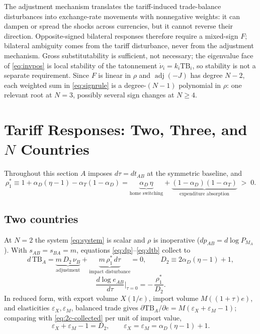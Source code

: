 \documentclass[11pt]{article}
\begin{document}
\noindent The adjustment mechanism translates the tariff-induced trade-balance disturbances into exchange-rate movements with nonnegative weights: it can dampen or spread the shocks across currencies, but it cannot reverse their direction. Opposite-signed bilateral responses therefore require a mixed-sign $F$; bilateral ambiguity comes from the tariff disturbance, never from the adjustment mechanism. Gross substitutability is sufficient, not necessary; the eigenvalue face of \eqref{eq:invpos} is local stability of the tatonnement $\dot\nu_i = k_i \mathrm{TB}_i$, so stability is not a separate requirement. Since $F$ is linear in $\rho$ and $\operatorname{adj}(-J)$ has degree $N-2$, each weighted sum in \eqref{eq:signrule} is a degree-$(N-1)$ polynomial in $\rho$: one relevant root at $N = 3$, possibly several sign changes at $N \geq 4$.

\section{Tariff Responses: Two, Three, and $N$ Countries}

Throughout this section $A$ imposes $d\tau = dt_{AB}$ at the symmetric baseline, and
\begin{equation}
\rho_1^*
\equiv 1 + \alpha_D(\eta-1) - \alpha_T(1-\alpha_D)
= \underbrace{\alpha_D\,\eta}_{\text{home switching}} + \underbrace{(1-\alpha_D)(1-\alpha_T)}_{\text{expenditure absorption}}
\;>\; 0 .
\label{eq:rho1-identity}
\end{equation}

\subsection{Two countries}

At $N = 2$ the system \eqref{eq:system} is scalar and $\rho$ is inoperative ($dp_{AB} = d\log P_{M_A}$). With $s_{AB} = s_{BA} = m$, equations \eqref{eq:dp}--\eqref{eq:dtb} collect to
\begin{equation}
d\,\mathrm{TB}_A
= \underbrace{m\, D_2\, \nu_B}_{\text{adjustment}}
+ \underbrace{m\, \rho_1^*\, d\tau}_{\text{impact disturbance}}
= 0,
\qquad
D_2 \equiv 2\alpha_D(\eta-1) + 1 ,
\label{eq:2c-collected}
\end{equation}
\begin{equation}
\boxed{\;
\frac{d\log e_{AB}}{d\tau}\bigg|_{\tau=0}
= -\,\frac{\rho_1^*}{D_2} .
\;}
\label{eq:2c-slope}
\end{equation}
In reduced form, with export volume $X(1/e)$, import volume $M((1+\tau)e)$, and elasticities $\varepsilon_X, \varepsilon_M$, balanced trade gives $\partial \mathrm{TB}_A/\partial e = M(\varepsilon_X + \varepsilon_M - 1)$; comparing with \eqref{eq:2c-collected} per unit of import value,
\begin{equation}
\varepsilon_X + \varepsilon_M - 1 = D_2,
\qquad
\varepsilon_X = \varepsilon_M = \alpha_D(\eta-1) + 1 .
\label{eq:ml-D2}
\end{equation}
\end{document}
